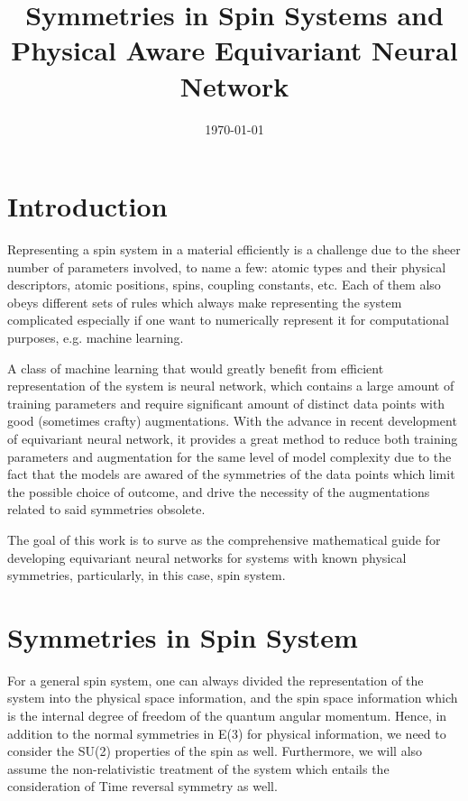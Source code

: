 \documentclass[reprint, 10pt]{revtex4-2}
\begin{document}
\title{Symmetries in Spin Systems and Physical Aware Equivariant Neural Network}

\date{\today}

\maketitle
\section{Introduction}
Representing a spin system in a material efficiently is a challenge due to the sheer number of parameters involved, 
to name a few: atomic types and their physical descriptors, atomic positions, spins, coupling constants, etc. 
Each of them also obeys different sets of rules which always make representing the system complicated especially
if one want to numerically represent it for computational purposes, e.g. machine learning.

A class of machine learning that would greatly benefit from efficient representation of the system is neural network,
which contains a large amount of training parameters and require significant amount of distinct data points with 
good (sometimes crafty) augmentations. With the advance in recent development of equivariant neural network, it provides
a great method to reduce both training parameters and augmentation for the same level of model complexity due to the
fact that the models are awared of the symmetries of the data points which limit the possible choice of outcome,
and drive the necessity of the augmentations related to said symmetries obsolete.

The goal of this work is to surve as the comprehensive mathematical guide for developing equivariant neural networks 
for systems with known physical symmetries, particularly, in this case, spin system.

\section{Symmetries in Spin System}
For a general spin system, one can always divided the representation of the system into the physical space information,
and the spin space information which is the internal degree of freedom of the quantum angular momentum. Hence, in addition
to the normal symmetries in E(3) for physical information, we need to consider the SU(2) properties of the spin as well.
Furthermore, we will also assume the non-relativistic treatment of the system which entails the consideration of Time
reversal symmetry as well.
\end{document}
